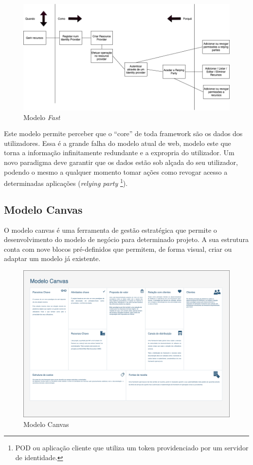\begin{figure}[h]
    \begin{center}
    \includegraphics[width=1\textwidth]{figures/Canvas-FAST.png}
    \caption{Modelo \emph{Fast}}
    \end{center}
\end{figure}

Este modelo permite perceber que o “core” de toda framework são os dados dos utilizadores. Essa é a grande falha do modelo atual de web, modelo este que torna a informação infinitamente redundante e a expropria do utilizador.
Um novo paradigma deve garantir que os dados estão sob alçada do seu utilizador, podendo o mesmo a qualquer momento tomar ações como revogar acesso a determinadas aplicações (\emph{relying party} \footnote{POD ou aplicação cliente que utiliza um token providenciado por um servidor de identidade.}).

\subsection{Modelo Canvas}
O modelo canvas é uma ferramenta de gestão estratégica que permite o desenvolvimento do modelo de negócio para determinado projeto. A sua estrutura conta com nove blocos pré-definidos que permitem, de forma visual, criar ou adaptar um modelo já existente\cite{alexander:2006}.
\begin{figure}[h]
    \begin{center}
    \includegraphics[width=1 \textwidth, angle=-90]{figures/Canvas-Canvas.png}
    \caption{Modelo Canvas}
    \end{center}
\end{figure}

